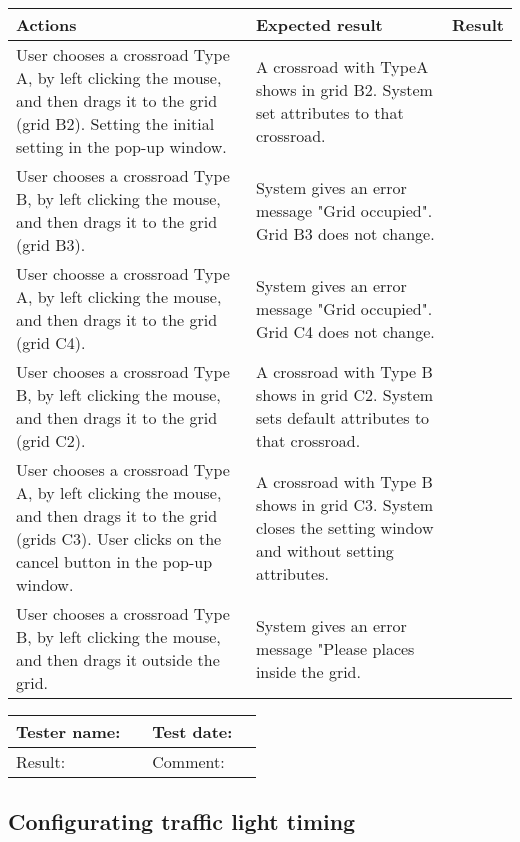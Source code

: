 	\begin{tabularx}{\textwidth}{|X|X|p{2.5cm}|}\hline
		Actions & Expected result & Result \\\hline
		User chooses a crossroad Type A, by left clicking the mouse, and then drags it to the grid (grid B2). Setting the initial setting in the pop-up window. & A crossroad with TypeA shows in grid B2. System set attributes to that crossroad. & \pass \\\hline
		User chooses a crossroad Type B, by left clicking the mouse, and then drags it to the grid (grid B3). & System gives an  error message "Grid occupied". Grid B3 does not change. & \pass\\\hline
		User choosse a crossroad Type A, by left clicking the mouse, and then drags it to the grid (grid C4). & System gives an  error message "Grid occupied". Grid C4 does not change. & \pass\\\hline
	    User chooses a crossroad Type B, by left clicking the mouse, and then drags it to the grid (grid C2). & A crossroad with Type B shows in grid C2. System sets default attributes to that crossroad. & \pass\\\hline
	    User chooses a crossroad Type A, by left clicking the mouse, and then drags it to the grid (grids C3). User clicks on the cancel button in the pop-up window. & A crossroad with Type B shows in grid C3. System closes the setting window and without setting attributes. & \pass\\\hline
	    User chooses a crossroad Type B, by left clicking the mouse, and then drags it outside the grid.& System gives an error message "Please places inside the grid. & \pass\\\hline
	     
	\end{tabularx}


\begin{tabularx}{\textwidth}{|p{3cm}X|p{3cm}X|}\hline
	Tester name: &  & Test date: & \\\hline
	Result: &   \pass & Comment: & \\\hline
\end{tabularx}

\newpage

\subsection{Configurating traffic light timing}

